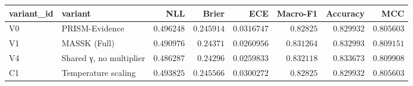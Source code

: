 \begin{tabular}{llrrrrrr}
\toprule
variant\_id & variant & NLL & Brier & ECE & Macro-F1 & Accuracy & MCC \\
\midrule
V0 & PRISM-Evidence & $0.496248$ & $0.245914$ & $0.0316747$ & $0.82825$ & $0.829932$ & $0.805603$ \\
V1 & MASSK (Full) & $0.490976$ & $0.24371$ & $0.0260956$ & $0.831264$ & $0.832993$ & $0.809151$ \\
V4 & Shared γ, no multiplier & $0.486287$ & $0.24296$ & $0.0259833$ & $0.832118$ & $0.833673$ & $0.809908$ \\
C1 & Temperature scaling & $0.493825$ & $0.245566$ & $0.0300272$ & $0.82825$ & $0.829932$ & $0.805603$ \\
\bottomrule
\end{tabular}
